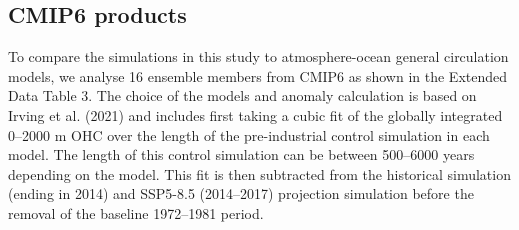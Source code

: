 \documentclass{nature}
\begin{document}
\begin{methods}
		\section*{CMIP6 products}
		To compare the simulations in this study to atmosphere-ocean general circulation models, we analyse 16 ensemble members from CMIP6 as shown in the Extended Data Table 3. The choice of the models and anomaly calculation is based on Irving et al. (2021)\cite{irving2021drift} and includes first taking a cubic fit of the globally integrated 0--2000 m OHC over the length of the pre-industrial control simulation in each model. The length of this control simulation can be between 500--6000 years depending on the model. This fit is then subtracted from the historical simulation (ending in 2014) and SSP5-8.5 (2014--2017) projection simulation before the removal of the baseline 1972--1981 period.
	\end{methods}
	
\end{document}
